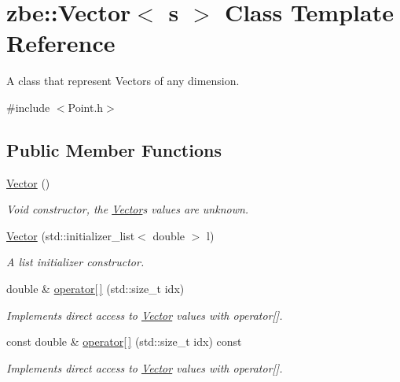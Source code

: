 \hypertarget{classzbe_1_1_vector}{}\section{zbe\+:\+:Vector$<$ s $>$ Class Template Reference}
\label{classzbe_1_1_vector}


A class that represent Vectors of any dimension.  




{\ttfamily \#include $<$Point.\+h$>$}

\subsection*{Public Member Functions}
\begin{DoxyCompactItemize}
\item 
\hyperlink{classzbe_1_1_vector_af478126eacae828b0d6454c5ae686c5f}{Vector} ()
\begin{DoxyCompactList}\small\item\em Void constructor, the \hyperlink{classzbe_1_1_vector}{Vector}\textquotesingle{}s values are unknown. \end{DoxyCompactList}\item 
\hyperlink{classzbe_1_1_vector_a7caf8410ba2f9f2d5671d4a1f1e5153c}{Vector} (std\+::initializer\+\_\+list$<$ double $>$ l)
\begin{DoxyCompactList}\small\item\em A list initializer constructor. \end{DoxyCompactList}\item 
double \& \hyperlink{classzbe_1_1_vector_a84bb0163dbc21094e70bf7340f4bb7dc}{operator\mbox{[}$\,$\mbox{]}} (std\+::size\+\_\+t idx)
\begin{DoxyCompactList}\small\item\em Implements direct access to \hyperlink{classzbe_1_1_vector}{Vector} values with operator\mbox{[}\mbox{]}. \end{DoxyCompactList}\item 
const double \& \hyperlink{classzbe_1_1_vector_a13087f897b6386630adf82f540fda49d}{operator\mbox{[}$\,$\mbox{]}} (std\+::size\+\_\+t idx) const 
\begin{DoxyCompactList}\small\item\em Implements direct access to \hyperlink{classzbe_1_1_vector}{Vector} values with operator\mbox{[}\mbox{]}. \end{DoxyCompactList}\item 

\end{DoxyCompactItemize}
